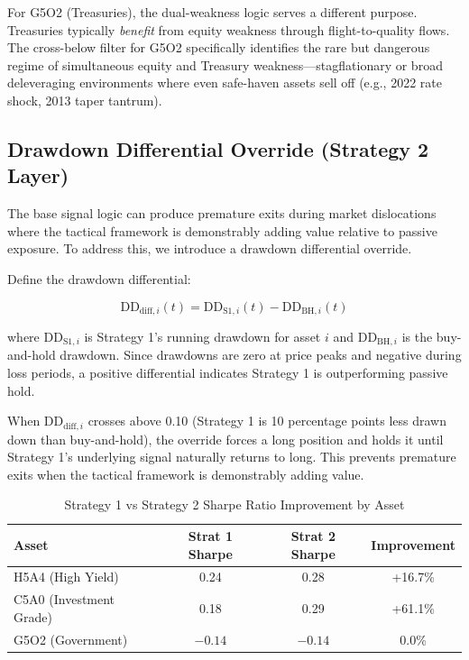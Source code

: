\documentclass[11pt]{article}
\begin{document}
For G5O2 (Treasuries), the dual-weakness logic serves a different purpose. Treasuries typically \textit{benefit} from equity weakness through flight-to-quality flows. The cross-below filter for G5O2 specifically identifies the rare but dangerous regime of simultaneous equity and Treasury weakness---stagflationary or broad deleveraging environments where even safe-haven assets sell off (e.g., 2022 rate shock, 2013 taper tantrum).

\subsection{Drawdown Differential Override (Strategy 2 Layer)}

The base signal logic can produce premature exits during market dislocations where the tactical framework is demonstrably adding value relative to passive exposure. To address this, we introduce a drawdown differential override.

Define the drawdown differential:

\begin{equation}
\text{DD}_{\text{diff},i}(t) = \text{DD}_{\text{S1},i}(t) - \text{DD}_{\text{BH},i}(t)
\end{equation}

where $\text{DD}_{\text{S1},i}$ is Strategy 1's running drawdown for asset $i$ and $\text{DD}_{\text{BH},i}$ is the buy-and-hold drawdown. Since drawdowns are zero at price peaks and negative during loss periods, a positive differential indicates Strategy 1 is outperforming passive hold.

When $\text{DD}_{\text{diff},i}$ crosses above 0.10 (Strategy 1 is 10 percentage points less drawn down than buy-and-hold), the override forces a long position and holds it until Strategy 1's underlying signal naturally returns to long. This prevents premature exits when the tactical framework is demonstrably adding value.

\begin{table}[H]
\centering
\caption{Strategy 1 vs Strategy 2 Sharpe Ratio Improvement by Asset}
\label{tab:strat_improvement}
\begin{tabular}{lccc}
\toprule
\textbf{Asset} & \textbf{Strat 1 Sharpe} & \textbf{Strat 2 Sharpe} & \textbf{Improvement} \\
\midrule
H5A4 (High Yield) & 0.24 & 0.28 & +16.7\% \\
C5A0 (Investment Grade) & 0.18 & 0.29 & +61.1\% \\
G5O2 (Government) & $-0.14$ & $-0.14$ & 0.0\% \\
\bottomrule
\end{tabular}
\end{table}
\end{document}
